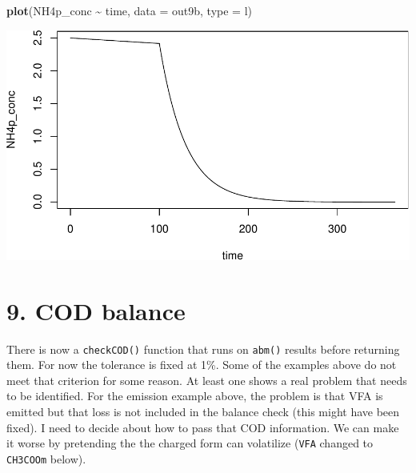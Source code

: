 \documentclass[
]{article}
\newenvironment{Shaded}{\begin{snugshade}}{\end{snugshade}}
\newcommand{\AttributeTok}[1]{\textcolor[rgb]{0.13,0.29,0.53}{#1}}
\newcommand{\FunctionTok}[1]{\textcolor[rgb]{0.13,0.29,0.53}{\textbf{#1}}}
\newcommand{\NormalTok}[1]{#1}
\newcommand{\SpecialCharTok}[1]{\textcolor[rgb]{0.81,0.36,0.00}{\textbf{#1}}}
\newcommand{\StringTok}[1]{\textcolor[rgb]{0.31,0.60,0.02}{#1}}
\begin{document}
\begin{Shaded}
\begin{Highlighting}[]
\FunctionTok{plot}\NormalTok{(NH4p\_conc }\SpecialCharTok{\textasciitilde{}}\NormalTok{ time, }\AttributeTok{data =}\NormalTok{ out9b, }\AttributeTok{type =} \StringTok{\textquotesingle{}l\textquotesingle{}}\NormalTok{)}
\end{Highlighting}
\end{Shaded}

\includegraphics{simple_demo_files/figure-latex/unnamed-chunk-68-2.pdf}

\hypertarget{cod-balance}{%
\section{9. COD balance}\label{cod-balance}}

There is now a \texttt{checkCOD()} function that runs on \texttt{abm()}
results before returning them. For now the tolerance is fixed at 1\%.
Some of the examples above do not meet that criterion for some reason.
At least one shows a real problem that needs to be identified. For the
emission example above, the problem is that VFA is emitted but that loss
is not included in the balance check (this might have been fixed). I
need to decide about how to pass that COD information. We can make it
worse by pretending the the charged form can volatilize (\texttt{VFA}
changed to \texttt{CH3COOm} below).
\end{document}
